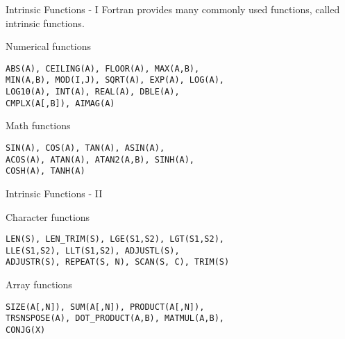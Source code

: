 \begin{frame}[fragile]{Intrinsic Functions - I}
Fortran provides many commonly used functions, called intrinsic functions.
\begin{block}{Numerical functions}
\begin{lstlisting}
ABS(A), CEILING(A), FLOOR(A), MAX(A,B), 
MIN(A,B), MOD(I,J), SQRT(A), EXP(A), LOG(A), 
LOG10(A), INT(A), REAL(A), DBLE(A), 
CMPLX(A[,B]), AIMAG(A)
\end{lstlisting}
\end{block}
\begin{block}{Math functions}
\begin{lstlisting}
SIN(A), COS(A), TAN(A), ASIN(A), 
ACOS(A), ATAN(A), ATAN2(A,B), SINH(A), 
COSH(A), TANH(A)
\end{lstlisting}
\end{block}
\end{frame}

\begin{frame}[fragile]{Intrinsic Functions - II}
\begin{block}{Character functions}
\begin{lstlisting}
LEN(S), LEN_TRIM(S), LGE(S1,S2), LGT(S1,S2),
LLE(S1,S2), LLT(S1,S2), ADJUSTL(S), 
ADJUSTR(S), REPEAT(S, N), SCAN(S, C), TRIM(S)
\end{lstlisting}
\end{block}
\begin{block}{Array functions}
\begin{lstlisting}
SIZE(A[,N]), SUM(A[,N]), PRODUCT(A[,N]), 
TRSNSPOSE(A), DOT_PRODUCT(A,B), MATMUL(A,B),
CONJG(X)
\end{lstlisting}
\end{block}
\end{frame}
